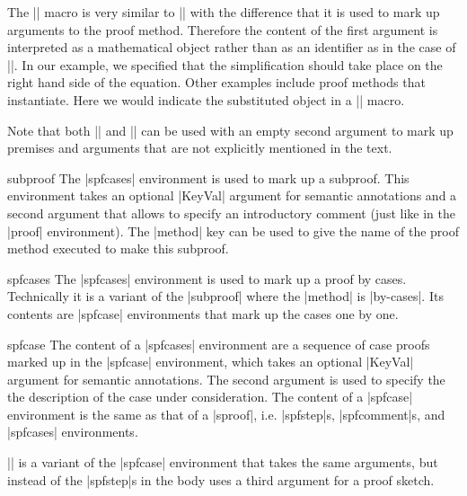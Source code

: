 \begin{function}{\justarg}
  The |\justarg| macro is very similar to |\premise| with the difference that it is used
  to mark up arguments to the proof method. Therefore the content of the first argument
  is interpreted as a mathematical object rather than as an identifier as in the case of
  |\premise|. In our example, we specified that the simplification should take place on
  the right hand side of the equation. Other examples include proof methods that
  instantiate. Here we would indicate the substituted object in a |\justarg| macro.
\end{function}

Note that both |\premise| and |\justarg| can be used with an empty second argument to
mark up premises and arguments that are not explicitly mentioned in the text.

\begin{environment}{subproof}
  The |spfcases| environment is used to mark up a subproof. This environment takes an
  optional |KeyVal| argument for semantic annotations and a second argument that allows
  to specify an introductory comment (just like in the |proof| environment). The
  |method| key can be used to give the name of the proof method
  executed to make this subproof.
\end{environment}

\begin{environment}{spfcases}
  The |spfcases| environment is used to mark up a proof by cases. Technically it is a
  variant of the |subproof| where the |method| is |by-cases|. Its contents are |spfcase|
  environments that mark up the cases one by one.
\end{environment}

\begin{environment}{spfcase}
  The content of a |spfcases| environment are a sequence of case proofs marked up in the
  |spfcase| environment, which takes an optional |KeyVal| argument for semantic
  annotations. The second argument is used to specify the the description of the case
  under consideration. The content of a |spfcase| environment is the same as that of a
  |sproof|, i.e. |spfstep|s, |spfcomment|s, and |spfcases| environments.
\end{environment}

\begin{function}{\spfcasesketch}
  |\spfcasesketch| is a variant of the |spfcase| environment that takes the same
  arguments, but instead of the |spfstep|s in the body uses a third argument for a proof
  sketch.
\end{function}

